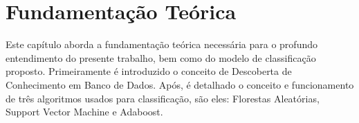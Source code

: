 \chapter{Fundamentação Teórica}
\label{cap:fundamentacao}
Este capítulo aborda a fundamentação teórica necessária para o profundo entendimento do presente trabalho, bem como do modelo de classificação proposto. Primeiramente é introduzido o conceito de Descoberta de Conhecimento em Banco de Dados. Após, é detalhado o conceito e funcionamento de três algoritmos usados para classificação, são eles: Florestas Aleatórias, Support Vector Machine e Adaboost. 










